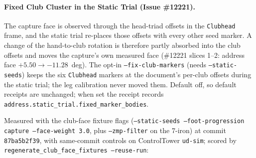 \documentclass[11pt,a4paper]{article}
\begin{document}
\paragraph{Fixed Club Cluster in the Static Trial (Issue \#12221).}
The capture face is observed through the head-triad offsets in the
\texttt{Clubhead} frame, and the static trial re-places those offsets with
every other seed marker. A change of the hand-to-club rotation is therefore
partly absorbed into the club offsets and moves the capture's own measured
face (\#12221 slices 1--2: address face $+5.50 \to -11.28$~deg). The opt-in
\texttt{--fix-club-markers} (needs \texttt{--static-seeds}) keeps the six
\texttt{Clubhead} markers at the document's per-club offsets during the
static trial; the leg calibration never moved them. Default off, so default
receipts are unchanged; when set the receipt records
\texttt{address.static\_trial.fixed\_marker\_bodies}.

Measured with the club-face fixture flags (\texttt{--static-seeds
--foot-progression capture --face-weight 3.0}, plus \texttt{--zmp-filter} on
the 7-iron) at commit \texttt{87ba5b2f39}, with same-commit controls on
ControlTower \texttt{ud-sim}; scored by
\texttt{regenerate\_club\_face\_fixtures --reuse-run}:
\end{document}
